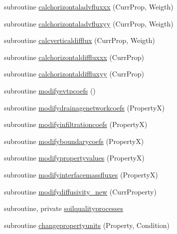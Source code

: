 \begin{DoxyCompactItemize}
\item 
subroutine \mbox{\hyperlink{namespacemoduleporousmediaproperties_a5723fa1fcf71ee69d8401d06efd65372}{calchorizontaladvfluxxx}} (Curr\+Prop, Weigth)
\item 
subroutine \mbox{\hyperlink{namespacemoduleporousmediaproperties_a0a76735f032f1dc67ea140ec4b090be9}{calchorizontaladvfluxyy}} (Curr\+Prop, Weigth)
\item 
subroutine \mbox{\hyperlink{namespacemoduleporousmediaproperties_aaa3c9648a06189bd69f555e24fa2a81e}{calcverticaldifflux}} (Curr\+Prop, Weigth)
\item 
subroutine \mbox{\hyperlink{namespacemoduleporousmediaproperties_ac3477d319b62465ddf85f06d31d2310b}{calchorizontaldiffluxxx}} (Curr\+Prop)
\item 
subroutine \mbox{\hyperlink{namespacemoduleporousmediaproperties_a060f429ecbcbfc17419b00ac5e09e9de}{calchorizontaldiffluxyy}} (Curr\+Prop)
\item 
subroutine \mbox{\hyperlink{namespacemoduleporousmediaproperties_acb53435edd626676edd69fc709aa276c}{modifyevtpcoefs}} ()
\item 
subroutine \mbox{\hyperlink{namespacemoduleporousmediaproperties_ab821bd146f4dac552711604b920efa4a}{modifydrainagenetworkcoefs}} (PropertyX)
\item 
subroutine \mbox{\hyperlink{namespacemoduleporousmediaproperties_a5e436455f541e5914817fe2e3c9aa3f1}{modifyinfiltrationcoefs}} (PropertyX)
\item 
subroutine \mbox{\hyperlink{namespacemoduleporousmediaproperties_a4a088b65d745be5c1c555008b706cf6a}{modifyboundarycoefs}} (PropertyX)
\item 
subroutine \mbox{\hyperlink{namespacemoduleporousmediaproperties_a4a86b3e01bf62024194ec6a00d661a86}{modifypropertyvalues}} (PropertyX)
\item 
subroutine \mbox{\hyperlink{namespacemoduleporousmediaproperties_a4f53429b96a7e06258d5ab4a001405e9}{modifyinterfacemassfluxes}} (PropertyX)
\item 
subroutine \mbox{\hyperlink{namespacemoduleporousmediaproperties_aed31037cfdb4a26f847b51c25507a881}{modifydiffusivity\+\_\+new}} (Curr\+Property)
\item 
subroutine, private \mbox{\hyperlink{namespacemoduleporousmediaproperties_a2045bbe7b3450cd88b6aae4509fbe0c5}{soilqualityprocesses}}
\item 
subroutine \mbox{\hyperlink{namespacemoduleporousmediaproperties_a4f575711195b1879221a0c494292c90c}{changepropertyunits}} (Property, Condition)

\end{DoxyCompactItemize}

